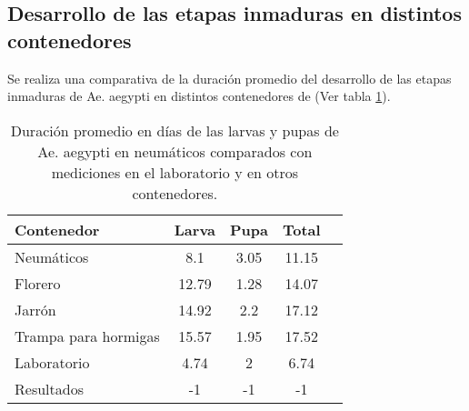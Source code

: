 
\subsection{Desarrollo de las etapas inmaduras en distintos contenedores}
Se realiza una comparativa de la duración promedio del desarrollo de las etapas inmaduras de Ae. aegypti 
en distintos contenedores de \cite{manrique1998desarrollo} (Ver tabla
\ref{tab:desarrollo-ciclo-contenedores-test}).

\begin{table}
\begin{center}
\begin{tabular}{p{5cm} c c c c }
Contenedor           & Larva & Pupa & Total \\
\hline
Neumáticos           & 8.1   & 3.05 & 11.15\\
Florero              & 12.79 & 1.28 & 14.07\\
Jarrón               & 14.92 & 2.2  & 17.12\\
Trampa para hormigas & 15.57 & 1.95 & 17.52\\
Laboratorio          & 4.74  & 2    & 6.74\\
Resultados           & -1    & -1   & -1\\
\end{tabular}

\caption{ \label{tab:desarrollo-ciclo-contenedores-test} Duración promedio en días de las  larvas y pupas
de Ae. aegypti en neumáticos comparados con mediciones en el laboratorio y en otros contenedores.}
\end{center}
\end{table}
